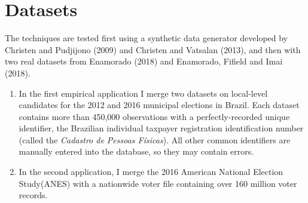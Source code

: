 \documentclass[11pt,reqno]{amsart}
\begin{document}
\section{Datasets}
The techniques are tested first using a synthetic data generator developed by Christen and Pudjijono (2009) and Christen and Vatsalan (2013), and then with two real datasets from Enamorado (2018) and Enamorado, Fifield and Imai (2018). 
\begin{enumerate}
\item In the first empirical application I merge two datasets on local-level candidates for the 2012 and 2016 municipal elections in Brazil.  Each dataset contains more than 450,000 observations with a perfectly-recorded unique identifier, the Brazilian individual taxpayer registration identification number (called the \textit{Cadastro de Pessoas F\'isicas}).  All other common identifiers are manually entered into the database, so they may contain errors.  

\item In the second application, I merge the 2016 American National Election Study(ANES) with a nationwide voter file containing over 160 million voter records.  
\end{enumerate}
\end{document}
